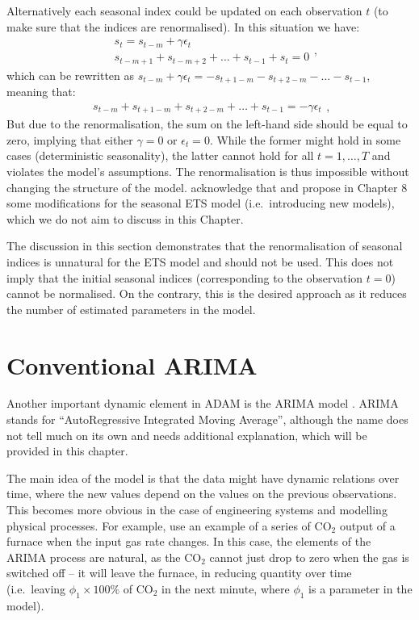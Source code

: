 \documentclass[
]{book}
\theoremstyle{definition}
\theoremstyle{definition}
\theoremstyle{definition}
\theoremstyle{definition}
\theoremstyle{remark}
\begin{document}
Alternatively each seasonal index could be updated on each observation \(t\) (to make sure that the indices are renormalised). In this situation we have:
\begin{equation*}
  \begin{aligned}
  &s_t = s_{t-m} + \gamma\epsilon_t \\
  &s_{t-m+1}+ s_{t-m+2}+ \dots+ s_{t-1} + s_{t} = 0
  \end{aligned},
\end{equation*}
which can be rewritten as \(s_{t-m} + \gamma\epsilon_t = -s_{t+1-m}- s_{t+2-m}- \dots- s_{t-1}\), meaning that:
\begin{equation*}
  \begin{aligned}
  s_{t-m}+ s_{t+1-m}+ s_{t+2-m}+ \dots+ s_{t-1} = -\gamma\epsilon_t
  \end{aligned},
\end{equation*}
But due to the renormalisation, the sum on the left-hand side should be equal to zero, implying that either \(\gamma=0\) or \(\epsilon_t=0\). While the former might hold in some cases (deterministic seasonality), the latter cannot hold for all \(t=1,\dots,T\) and violates the model's assumptions. The renormalisation is thus impossible without changing the structure of the model. \citet{Hyndman2008b} acknowledge that and propose in Chapter 8 some modifications for the seasonal ETS model (i.e.~introducing new models), which we do not aim to discuss in this Chapter.

The discussion in this section demonstrates that the renormalisation of seasonal indices is unnatural for the ETS model and should not be used. This does not imply that the initial seasonal indices (corresponding to the observation \(t=0\)) cannot be normalised. On the contrary, this is the desired approach as it reduces the number of estimated parameters in the model.

\hypertarget{ARIMA}{%
\chapter{Conventional ARIMA}\label{ARIMA}}

Another important dynamic element in ADAM is the ARIMA model \citep[developed originally by][]{Box1976}. ARIMA stands for ``AutoRegressive Integrated Moving Average'', although the name does not tell much on its own and needs additional explanation, which will be provided in this chapter.

The main idea of the model is that the data might have dynamic relations over time, where the new values depend on the values on the previous observations. This becomes more obvious in the case of engineering systems and modelling physical processes. For example, \citet{Box1976} use an example of a series of CO\(_2\) output of a furnace when the input gas rate changes. In this case, the elements of the ARIMA process are natural, as the CO\(_2\) cannot just drop to zero when the gas is switched off -- it will leave the furnace, in reducing quantity over time (i.e.~leaving \(\phi_1\times100\%\) of CO\(_2\) in the next minute, where \(\phi_1\) is a parameter in the model).
\end{document}
